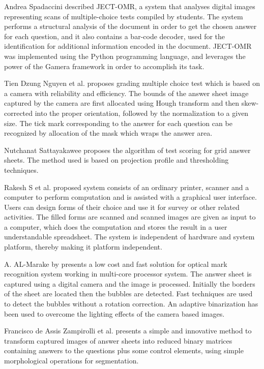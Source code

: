 \documentclass[a4paper,10pt]{article}
\begin{document}
Andrea Spadaccini described JECT-OMR, a system that analyses digital images representing scans of multiple-choice tests compiled by students. The system performs a structural analysis of the document in order to get the chosen answer for each question, and it also contains a bar-code decoder, used for the identification for additional information encoded in the document. JECT-OMR was implemented using the Python programming language, and leverages the power of the Gamera framework in order to accomplish its task.

Tien Dzung Nguyen et al. proposes grading multiple choice test which is based on a camera with reliability and efficiency. The bounds of the answer sheet image captured by the camera are first allocated using Hough transform and then skew-corrected into the proper orientation, followed by the normalization to a given size. The tick mark corresponding to the answer for each question can be recognized by allocation of the mask which wraps the answer area.

Nutchanat Sattayakawee proposes the algorithm of test scoring for grid answer sheets. The method used is based on projection profile and thresholding techniques.

Rakesh S et al. proposed system consists of an ordinary printer, scanner and a computer to perform computation and is assisted with a graphical user interface. Users can design forms of their choice and use it for survey or other related activities. The filled forms are scanned and scanned images are given as input to a computer, which does the computation and stores the result in a user understandable spreadsheet. The system is independent of hardware and system platform, thereby making it platform independent.

A. AL-Marake by presents a low cost and fast solution for optical mark recognition system working in multi-core processor system. The answer sheet is captured using a digital camera and the image is processed. Initially the borders of the sheet are located then the bubbles are detected. Fast techniques are used to detect the bubbles without a rotation correction. An adaptive binarization has been used to overcome the lighting effects of the camera based images.

Francisco de Assis Zampirolli et al. presents a simple and innovative method to transform captured images of answer sheets into reduced binary matrices containing answers to the questions plus some control elements, using simple morphological operations for segmentation.
\end{document}
